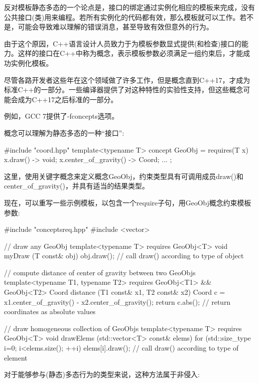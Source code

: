 反对模板静态多态的一个论点是，接口的绑定通过实例化相应的模板来完成，没有公共接口(类)用来编程。若所有实例化的代码都有效，那么模板就可以工作。若不是，可能会导致难以理解的错误消息，甚至导致有效但意外的行为。

由于这个原因，C++语言设计人员致力于为模板参数显式提供(和检查)接口的能力。这样的接口在C++中称为概念，表示模板参数必须满足一组约束后，才能成功实例化模板。

尽管各路开发者这些年在这个领域做了许多工作，但是概念直到C++17，才成为标准C++的一部分。一些编译器提供了对这种特性的实验性支持，但这些概念可能会成为C++17之后标准的一部分。

\begin{notice}例如，GCC 7提供了-fconcepts选项。
\end{notice}

概念可以理解为静态多态的一种“接口”:

\begin{cpp}
#include "coord.hpp"
template<typename T>
concept GeoObj = requires(T x) {
	{ x.draw() } -> void;
	{ x.center_of_gravity() } -> Coord;
	...
};
\end{cpp}

这里，使用关键字概念来定义概念GeoObj，约束类型具有可调用成员draw()和center\_of\_gravity()，并具有适当的结果类型。

现在，可以重写一些示例模板，以包含一个require子句，用GeoObj概念约束模板参数:

\begin{cpp}
#include "conceptsreq.hpp"
#include <vector>

// draw any GeoObj
template<typename T>
requires GeoObj<T>
void myDraw (T const& obj)
{
	obj.draw(); // call draw() according to type of object
}

// compute distance of center of gravity between two GeoObjs
template<typename T1, typename T2>
requires GeoObj<T1> && GeoObj<T2>
Coord distance (T1 const& x1, T2 const& x2)
{
	Coord c = x1.center_of_gravity() - x2.center_of_gravity();
	return c.abs(); // return coordinates as absolute values
}

// draw homogeneous collection of GeoObjs
template<typename T>
requires GeoObj<T>
void drawElems (std::vector<T> const& elems)
{
	for (std::size_type i=0; i<elems.size(); ++i) {
		elems[i].draw(); // call draw() according to type of element
	}
}
\end{cpp}

对于能够参与(静态)多态行为的类型来说，这种方法属于非侵入:

